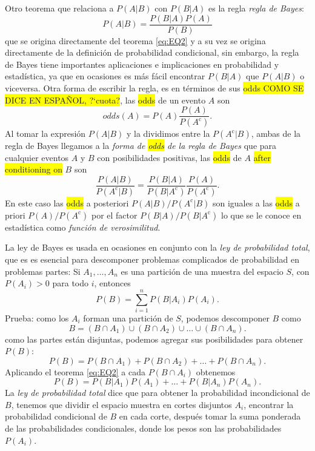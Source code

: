 \documentclass[12pt,letterpaper]{article}
\begin{document}
Otro teorema que relaciona a $P(A|B)$ con $P(B|A)$ es la regla \emph{regla de Bayes}:
\begin{equation}
P(A|B)=\frac{P(B|A)P(A)}{P(B)}
\end{equation}
que se origina directamente del teorema \eqref{eq:EQ2} y a su vez se origina directamente de la definición de probabilidad condicional, sin embargo, la regla de Bayes tiene importantes aplicaciones e implicaciones en probabilidad y estadística, ya que en ocasiones es más fácil encontrar $P(B|A)$ que $P(A|B)$ o viceversa. Otra forma de escribir la regla, es en términos de sus \colorbox{yellow}{odds COMO SE DICE EN ESPAÑOL, ?`cuota?}, las \colorbox{yellow}{odds} de un evento $A$ son
\begin{equation}
odds(A)=P(A)\frac{P(A)}{P(A^\text{c})}.
\end{equation}
Al tomar la expresión $P(A|B)$ y la dividimos entre la $P(A^\text{c}|B)$, ambas de la regla de Bayes llegamos a la \emph{forma de \colorbox{yellow}{odds} de la regla de Bayes} que para cualquier eventos $A$ y $B$ con posibilidades positivas, las \colorbox{yellow}{odds} de $A$ \colorbox{yellow}{after conditioning on} $B$ son
\begin{equation}
\frac{P(A|B)}{P(A^\text{c}|B)}=\frac{P(B|A)}{P(B|A^\text{c})}\frac{P(A)}{P(A^\text{c})}.
\end{equation}
En este caso las \colorbox{yellow}{odds} a posteriori $P(A|B)/P(A^\text{c}|B)$ son iguales a las \colorbox{yellow}{odds} a priori $P(A)/P(A^\text{c})$ por el factor $P(B|A)/P(B|A^\text{c})$ lo que se le conoce en estadística como \emph{función de verosimilitud}.

La ley de Bayes es usada en ocasiones en conjunto con la \emph{ley de probabilidad total}, que es es esencial para descomponer problemas complicados de probabilidad en problemas partes: Si $A_1,\ldots,A_n$ es una partición de una muestra del espacio $S$, con $P(A_i)>0$ para todo $i$, entonces
\begin{equation}
P(B)=\sum_{i=1}^{n}P(B|A_i)P(A_i).
\end{equation}
Prueba: como los $A_i$ forman una partición de $S$, podemos descomponer $B$ como
\begin{equation}
B=(B\cap A_1)\cup(B\cap A_2)\cup\ldots\cup(B\cap A_n).
\end{equation}
como las partes están disjuntas, podemos agregar sus posibilidades para obtener $P(B)$:
\begin{equation}
P(B)=P(B\cap A_1)+P(B\cap A_2)+\ldots+P(B\cap A_n).
\end{equation}
Aplicando el teorema \eqref{eq:EQ2} a cada $P(B\cap A_i)$ obtenemos
\begin{equation}
P(B)=P(B|A_1)P(A_1)+\ldots+P(B|A_n)P(A_n).
\end{equation}
La \emph{ley de probabilidad total} dice que para obtener la probabilidad incondicional de $B$, tenemos que dividir el espacio muestra en cortes disjuntos $A_i$, encontrar la probabilidad condicional de $B$ en cada corte, después tomar la suma ponderada de las probabilidades condicionales, donde los pesos son las probabilidades $P(A_i)$.
\end{document}
